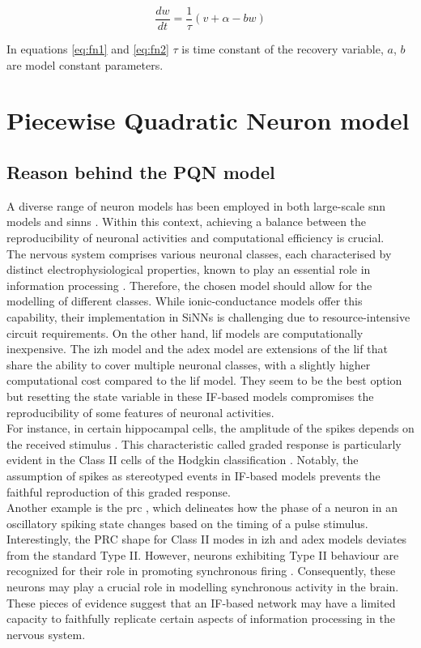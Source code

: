 \begin{equation}
    \frac{dw}{dt}=\frac{1}{\tau}(v+\alpha-bw)
    \label{eq:fn2}
\end{equation}

In equations \ref{eq:fn1} and \ref{eq:fn2} \(\tau\) is time constant of the recovery variable,
\(a\), \(b\) are model constant parameters.

\section{Piecewise Quadratic Neuron model}
\subsection{Reason behind the PQN model}
A diverse range of neuron models has been employed in both large-scale \acrshort{snn} models and \acrshort{sinn}s \cite{Frenkel2023}. Within this context, achieving a balance between the reproducibility of neuronal activities and computational efficiency is crucial.\\

The nervous system comprises various neuronal classes, each characterised by distinct electrophysiological properties, known to play an essential role in information processing \cite{Cunningham,Benda,GRILLNER}. Therefore, the chosen model should allow for the modelling of different classes. While ionic-conductance models offer this capability, their implementation in SiNNs is challenging due to resource-intensive circuit requirements. On the other hand, \acrshort{lif} models are computationally inexpensive. The \acrshort{izh} model and the \acrshort{adex} model are extensions of the \acrshort{lif} that share the ability to cover multiple neuronal classes, with a slightly higher computational cost compared to the \acrshort{lif} model. They seem to be the best option but resetting the state variable in these IF-based models compromises the reproducibility of some features of neuronal activities.\\

For instance, in certain hippocampal cells, the amplitude of the spikes depends on the received stimulus \cite{Alle}. This characteristic called graded response is particularly evident \cite{Rinzel} in the Class II cells of the Hodgkin classification \cite{Hodgkin}. Notably, the assumption of spikes as stereotyped events in IF-based models prevents the faithful reproduction of this graded response.\\
Another example is the \acrfull{prc} \cite{Rinzel}, 
which delineates how the phase of a neuron in an 
oscillatory spiking state changes based on the timing 
of a pulse stimulus. Interestingly, the PRC shape for 
Class II modes in \acrshort{izh} and \acrshort{adex} 
models deviates from the standard Type II. However, 
neurons exhibiting Type II behaviour are recognized 
for their role in promoting synchronous firing 
\cite{Hansel}. Consequently, these neurons may play a 
crucial role in modelling synchronous activity in the 
brain. These pieces of evidence suggest that an IF-based
network may have a limited capacity to faithfully 
replicate certain aspects of information processing in
the nervous system.\\

